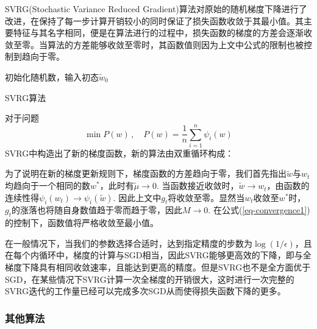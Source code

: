 SVRG(Stochastic Variance Reduced Gradient)\cite{johnsonAcceleratingStochasticGradient}算法对原始的随机梯度下降进行了改进，在保持了每一步计算开销较小的同时保证了损失函数收敛于其最小值。其主要特征与其名字相同，便是在算法进行的过程中，损失函数的梯度的方差会逐渐收敛至零。当算法的方差能够收敛至零时，其函数值则因为上文中公式的限制也被控制到趋向于零。
\begin{algorithm}[htb]
	
	
	初始化随机数，输入初态$\tilde{w}_0$\;
	\caption{SVRG算法}
	\label{algo:algorithm2}
\end{algorithm}

对于问题
\begin{equation}\label{key}
\min P(w)\,,\quad P(w)=\frac1n \sum_{i=1}^n \psi_i(w)
\end{equation}
SVRG中构造出了新的梯度函数，新的算法由双重循环构成：

为了说明在新的梯度更新规则下，梯度函数的方差趋向于零，我们首先指出$\tilde{w}$与$w_t$均趋向于一个相同的数$w^*$，此时有$\tilde{\mu}\to 0$. 当函数接近收敛时，$\tilde{w}\to w_t$，由函数的连续性得$\psi_i(w_t)\to\psi_i(\tilde{w})$. 因此上文中$g_t$将收敛至零。显然当$w_t$收敛至$w^*$时，$g_t$的涨落也将随自身数值趋于零而趋于零，因此$M\to 0$. 在公式(\ref{eq-convergence1})的控制下，函数值将严格收敛至最小值。

在一般情况下，当我们的参数选择合适时，达到指定精度的步数为$\log(1/\epsilon)$，且在每个内循环中，梯度的计算与SGD相当，因此SVRG能够更高效的下降，即与全梯度下降具有相同收敛速率，且能达到更高的精度。但是SVRG也不是全方面优于SGD，在某些情况下SVRG计算一次全梯度的开销很大，这时进行一次完整的SVRG迭代的工作量已经可以完成多次SGD从而使得损失函数下降的更多。

\subsubsection{其他算法}

